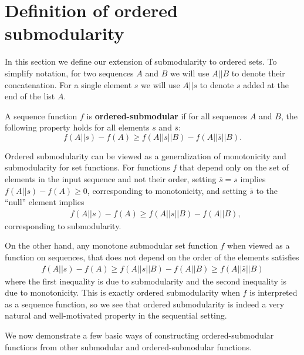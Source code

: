 
% 

\section{Definition of ordered submodularity}\label{sec:ordsub_defn}

In this section we define our extension of submodularity to ordered sets. To simplify notation, for two sequences $A$ and $B$ we will use $A||B$ to denote their concatenation. For a single element $s$ we will use $A||s$ to denote $s$ added at the end of the list $A$.


\begin{defn}
A sequence function $f$ is \textbf{ordered-submodular} if for all sequences $A$ and $B$, the following property holds for all elements $s$ and $\bar s$: $$f(A||s)-f(A)\ge f(A|| s||B)-f(A||\bar s||B).$$
\end{defn}

Ordered submodularity can be viewed as a generalization of monotonicity and submodularity for set functions. For functions $f$ that depend only on the set of elements in the input sequence and not their order, setting $\bar s=s$ implies $f(A||s)-f(A)\ge 0$, corresponding to monotonicity, and setting $\bar s$ to the ``null'' element implies 
\begin{align*}
    &f(A||s)-f(A) \ge f(A||s||B)-f(A||B),
\end{align*}
corresponding to submodularity.

On the other hand, any monotone submodular set function $f$ when viewed as a function on sequences, that does not depend on the order of the elements satisfies
\begin{align*}
f(A||s)-f(A)\ge f(A||s||B)-f(A||B)\ge f(A||\bar s||B)
\end{align*}
where the first inequality is due to submodularity and the second inequality is due to monotonicity. This is exactly ordered submodularity when $f$ is interpreted as a sequence function, so we see that ordered submodularity is indeed a very natural and well-motivated property in the sequential setting.

We now demonstrate a few basic ways of constructing ordered-submodular functions from other submodular and ordered-submodular functions.

